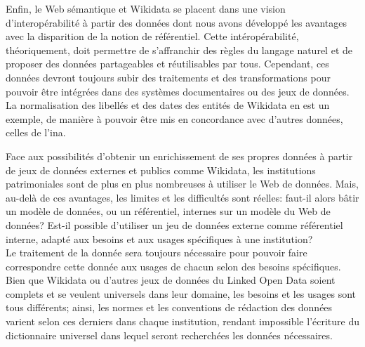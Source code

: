 Enfin, le Web sémantique et Wikidata se placent dans une vision d'interopérabilité à partir des données dont nous avons développé les avantages avec la disparition de la notion de référentiel. Cette intéropérabilité, théoriquement, doit permettre de s'affranchir des règles du langage naturel et de proposer des données partageables et réutilisables par tous. Cependant, ces données devront toujours subir des traitements et des transformations pour pouvoir être intégrées dans des systèmes documentaires ou des jeux de données. La normalisation des libellés et des dates des entités de Wikidata en est un exemple, de manière à pouvoir être mis en concordance avec d'autres données, celles de l'\ac{ina}.

\bigskip
\bigskip
Face aux possibilités d'obtenir un enrichissement de ses propres données à partir de jeux de données externes et publics comme Wikidata, les institutions patrimoniales sont de plus en plus nombreuses à utiliser le Web de données. Mais, au-delà de ces avantages, les limites et les difficultés sont réelles: faut-il alors bâtir un modèle de données, ou un référentiel, internes sur un modèle du Web de données? Est-il possible d'utiliser un jeu de données externe comme référentiel interne, adapté aux besoins et aux usages spécifiques à une institution?\\

Le traitement de la donnée sera toujours nécessaire pour pouvoir faire correspondre cette donnée aux usages de chacun selon des besoins spécifiques. Bien que Wikidata ou d'autres jeux de données du Linked Open Data soient complets et se veulent universels dans leur domaine, les besoins et les usages sont tous différents; ainsi, les normes et les conventions de rédaction des données varient selon ces derniers dans chaque institution, rendant impossible l'écriture du dictionnaire universel dans lequel seront recherchées les données nécessaires.